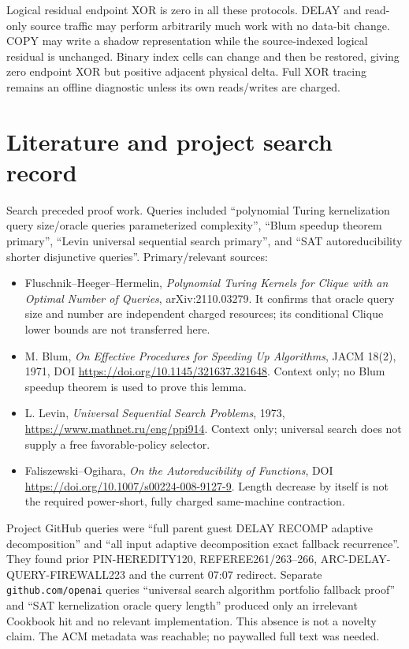 \documentclass[11pt]{article}
\begin{document}
Logical residual endpoint XOR is zero in all these protocols.  DELAY and
read-only source traffic may perform arbitrarily much work with no data-bit
change.  COPY may write a shadow representation while the source-indexed
logical residual is unchanged.  Binary index cells can change and then be
restored, giving zero endpoint XOR but positive adjacent physical delta.  Full
XOR tracing remains an offline diagnostic unless its own reads/writes are
charged.

\section{Literature and project search record}
Search preceded proof work.  Queries included ``polynomial Turing
kernelization query size/oracle queries parameterized complexity'', ``Blum
speedup theorem primary'', ``Levin universal sequential search primary'', and
``SAT autoreducibility shorter disjunctive queries''.  Primary/relevant sources:
\begin{itemize}
\item Fluschnik--Heeger--Hermelin, \emph{Polynomial Turing Kernels for Clique
with an Optimal Number of Queries}, arXiv:2110.03279.  It confirms that oracle
query size and number are independent charged resources; its conditional
Clique lower bounds are not transferred here.
\item M. Blum, \emph{On Effective Procedures for Speeding Up Algorithms},
JACM 18(2), 1971, DOI \url{https://doi.org/10.1145/321637.321648}.  Context only;
no Blum speedup theorem is used to prove this lemma.
\item L. Levin, \emph{Universal Sequential Search Problems}, 1973,
\url{https://www.mathnet.ru/eng/ppi914}.  Context only; universal search does
not supply a free favorable-policy selector.
\item Faliszewski--Ogihara, \emph{On the Autoreducibility of Functions}, DOI
\url{https://doi.org/10.1007/s00224-008-9127-9}.  Length decrease by itself is
not the required power-short, fully charged same-machine contraction.
\end{itemize}
Project GitHub queries were ``full parent guest DELAY RECOMP adaptive
decomposition'' and ``all input adaptive decomposition exact fallback
recurrence''.  They found prior PIN-HEREDITY120, REFEREE261/263--266,
ARC-DELAY-QUERY-FIREWALL223 and the current 07:07 redirect.  Separate
\texttt{github.com/openai} queries ``universal search algorithm portfolio
fallback proof'' and ``SAT kernelization oracle query length'' produced only an
irrelevant Cookbook hit and no relevant implementation.  This absence is not
a novelty claim.  The ACM metadata was reachable; no paywalled full text was
needed.
\end{document}
